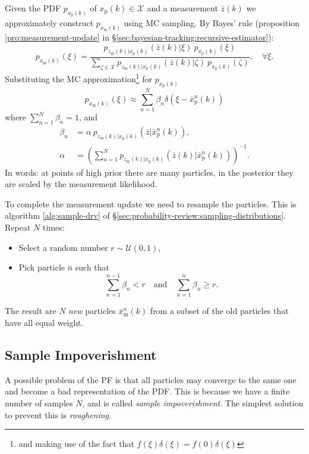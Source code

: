\documentclass[]{hsrzf}
\theoremstyle{plain}
\theoremstyle{definition}
\theoremstyle{remark}
\begin{document}
Given the PDF $p_{x_\mathrm{p}(k)}$ of $x_\mathrm{p}(k) \in \mathcal{X}$ and a
measurement $\bar{z}(k)$ we approximately construct $p_{x_\mathrm{m}(k)}$
using MC sampling. By Bayes' rule (proposition \ref{pro:measurement-update} in
\S\ref{sec:bayesian-tracking:recursive-estimator}):
\[
  p_{x_\mathrm{m}(k)}(\xi) = \frac{
    p_{z_\mathrm{m}(k) | x_\mathrm{p}(k)} (\bar{z}(k) | \xi)
    ~
    p_{x_\mathrm{p}(k)}(\xi)
  }{
    \sum_{\zeta\in\mathcal{X}}
      p_{z_\mathrm{m}(k) | x_\mathrm{p}(k)} (\bar{z}(k) | \zeta)
      ~
      p_{x_\mathrm{p}(k)}(\zeta)
  },
  \quad\forall \xi.
\]
Substituting the MC approximation\footnote{and making use of the fact that
$f(\xi) \delta(\xi) = f(0) \delta(\xi)$} for $p_{x_\mathrm{p}(k)}$
\[
  p_{x_\mathrm{m}(k)}(\xi) \approx
    \sum_{n=1}^N \beta_n \delta(\xi - \bar{x}_\mathrm{p}^n(k))
\]
where $\sum_{n=1}^N \beta_n = 1$, and
\begin{align*}
  \beta_n &= \alpha ~ p_{z_\mathrm{m}(k) | x_\mathrm{p}(k)}
    (\bar{z} | \bar{x}_\mathrm{p}^n(k)), \\
  \alpha &= \left( \sum_{n=1}^N
    p_{z_\mathrm{m}(k) | x_\mathrm{p}(k)}
      (\bar{z}(k) | \bar{x}_\mathrm{p}^n(k))
  \right)^{-1}.
\end{align*}
In words: at points of high prior there are many particles, in the posterior
they are scaled by the measurement likelihood.

To complete the measurement update we need to resample the particles. This is
algorithm \ref{alg:sample-drv} of
\S\ref{sec:probability-review:sampling-distributions}. Repeat $N$ times:
\begin{itemize}
  \item Select a random number $r \sim \mathcal{U}(0,1)$,
  \item Pick particle $\bar{n}$ such that
    \[
      \sum_{n=1}^{\bar{n}-1} \beta_n < r
      \quad\text{and}\quad
      \sum_{n=1}^{\bar{n}} \beta_n \geq r.
    \]
\end{itemize}
The result are $N$ \emph{new} particles $\bar{x}_\mathrm{m}^n(k)$ from a
subset of the old particles that have all equal weight.

\subsection{Sample Impoverishment}

A possible problem of the PF is that all particles may converge to the same
one and become a bad representation of the PDF. This is because we have a
finite number of samples $N$, and is called \emph{sample impoverishment}. The
simplest solution to prevent this is \emph{roughening}.
\end{document}
